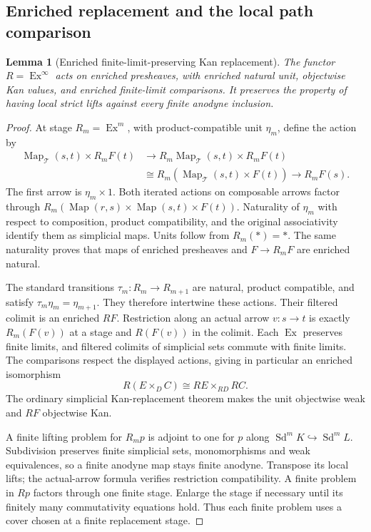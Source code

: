 \documentclass[12pt]{amsart}
\newtheorem{lem}[thm]{Lemma}
\theoremstyle{definition}
\theoremstyle{remark}
\numberwithin{equation}{section}
\newcommand{\CT}{\mathcal T}
\DeclareMathOperator{\Map}{Map}
\DeclareMathOperator{\Ex}{Ex}
\DeclareMathOperator{\Sd}{Sd}
\begin{document}
\subsection{Enriched replacement and the local path comparison}

\begin{lem}[Enriched finite-limit-preserving Kan replacement]
The functor $R=\Ex^\infty$ acts on enriched presheaves,
with enriched natural unit, objectwise Kan values, and
enriched finite-limit comparisons.
\label{lem:enriched-ex-replacement}
It preserves the property of having local strict lifts
against every finite anodyne inclusion.
\end{lem}

\begin{proof}
At stage $R_m=\Ex^m$, with product-compatible unit
$\eta_m$, define the action by
\[
\begin{split}
 \Map_{\CT}(s,t)\times R_mF(t)
 &\longrightarrow
 R_m\Map_{\CT}(s,t)\times R_mF(t)\\
 &\cong R_m(\Map_{\CT}(s,t)\times F(t))
 \longrightarrow R_mF(s).
\end{split}
\]
The first arrow is $\eta_m\times1$. Both iterated
actions on composable arrows factor through
$R_m(\Map(r,s)\times\Map(s,t)\times F(t))$.
Naturality of $\eta_m$ with respect to composition,
product compatibility, and the original associativity
identify them as simplicial maps. Units follow from
$R_m(*)=*$. The same naturality proves that maps of
enriched presheaves and $F\to R_mF$ are enriched natural.

The standard transitions $\tau_m:R_m\to R_{m+1}$
are natural, product compatible, and satisfy
$\tau_m\eta_m=\eta_{m+1}$. They therefore intertwine
these actions. Their filtered colimit is an enriched
$RF$. Restriction along an actual arrow $v:s\to t$
is exactly $R_m(F(v))$ at a stage and $R(F(v))$ in
the colimit. Each $\Ex$ preserves finite limits,
and filtered colimits of simplicial sets commute with
finite limits. The comparisons respect the displayed
actions, giving in particular an enriched isomorphism
\[
 R(E\times_D C)\cong RE\times_{RD}RC.
\]
The ordinary simplicial Kan-replacement theorem makes
the unit objectwise weak and $RF$ objectwise Kan.

A finite lifting problem for $R_mp$ is adjoint to
one for $p$ along $\Sd^mK\hookrightarrow\Sd^mL$.
Subdivision preserves finite simplicial sets,
monomorphisms and weak equivalences, so a finite
anodyne map stays finite anodyne. Transpose its local
lifts; the actual-arrow formula verifies restriction
compatibility. A finite problem in $Rp$ factors through
one finite stage. Enlarge the stage if necessary until
its finitely many commutativity equations hold.
Thus each finite problem uses a cover chosen at a
finite replacement stage.
\end{proof}
\end{document}
